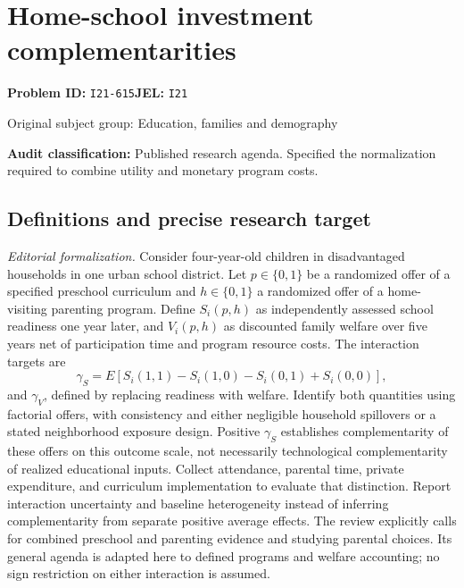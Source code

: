 \documentclass[11pt,a4paper]{article}
\begin{document}
\section*{Home-school investment complementarities}
\textbf{Problem ID:} \texttt{I21-615}\quad \textbf{JEL:} \texttt{I21}\par
\label{problem:OP-0451}
{\sffamily\small\color{muted}Original subject group: Education, families and demography\par}
\label{definitions:problem:30007733}
\textbf{Audit classification:} Published research agenda. Specified the normalization required to combine utility and monetary program costs.
\subsection*{Definitions and precise research target}
\textit{Editorial formalization.} Consider four-year-old children in disadvantaged households in one urban school district. Let \(p\in\{0,1\}\) be a randomized offer of a specified preschool curriculum and \(h\in\{0,1\}\) a randomized offer of a home-visiting parenting program. Define \(S_i(p,h)\) as independently assessed school readiness one year later, and \(V_i(p,h)\) as discounted family welfare over five years net of participation time and program resource costs. The interaction targets are
\[\gamma_S=E[S_i(1,1)-S_i(1,0)-S_i(0,1)+S_i(0,0)],\]
and \(\gamma_V\), defined by replacing readiness with welfare. Identify both quantities using factorial offers, with consistency and either negligible household spillovers or a stated neighborhood exposure design. Positive \(\gamma_S\) establishes complementarity of these offers on this outcome scale, not necessarily technological complementarity of realized educational inputs. Collect attendance, parental time, private expenditure, and curriculum implementation to evaluate that distinction. Report interaction uncertainty and baseline heterogeneity instead of inferring complementarity from separate positive average effects. The review explicitly calls for combined preschool and parenting evidence and studying parental choices. Its general agenda is adapted here to defined programs and welfare accounting; no sign restriction on either interaction is assumed.
\end{document}
